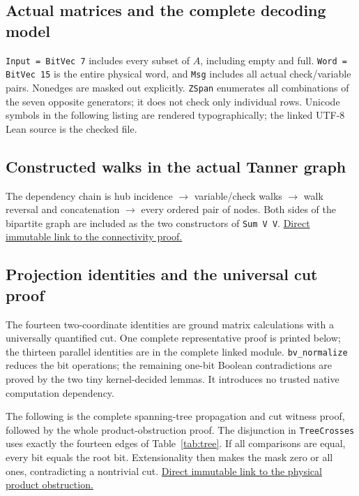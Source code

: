 \subsection{Actual matrices and the complete decoding model}
\texttt{Input = BitVec 7} includes every subset of $A$, including empty
and full. \texttt{Word = BitVec 15} is the entire physical word, and
\texttt{Msg} includes all actual check/variable pairs. Nonedges are masked
out explicitly. \texttt{ZSpan} enumerates all combinations of the seven
opposite generators; it does not check only individual rows.
Unicode symbols in the following listing are rendered typographically;
the linked UTF-8 Lean source is the checked file.

\subsection{Constructed walks in the actual Tanner graph}
The dependency chain is hub incidence $\to$ variable/check walks $\to$
walk reversal and concatenation $\to$ every ordered pair of nodes.
Both sides of the bipartite graph are included as the two constructors
of \texttt{Sum V V}.
\href{https://github.com/alectionary/vibe-math/blob/65bcfe0d8573a392f250295fcfa3619b586e4159/formalization/gallager-b-absorbing/connected/Connected.lean#L154}{Direct immutable link to the connectivity proof.}
\subsection{Projection identities and the universal cut proof}
The fourteen two-coordinate identities are ground matrix calculations
with a universally quantified cut. One complete representative proof is
printed below; the thirteen parallel identities are in the complete linked
module. \texttt{bv\_normalize} reduces the bit operations; the remaining
one-bit Boolean contradictions are proved by the two tiny kernel-decided
lemmas. It introduces no trusted native computation dependency.

The following is the complete spanning-tree propagation and cut witness
proof, followed by the whole product-obstruction proof. The disjunction
in \texttt{TreeCrosses} uses exactly the fourteen edges of Table~\ref{tab:tree}.
If all comparisons are equal, every bit equals the root bit. Extensionality
then makes the mask zero or all ones, contradicting a nontrivial cut.
\href{https://github.com/alectionary/vibe-math/blob/65bcfe0d8573a392f250295fcfa3619b586e4159/formalization/gallager-b-absorbing/connected/Connected.lean#L451}{Direct immutable link to the physical product obstruction.}
